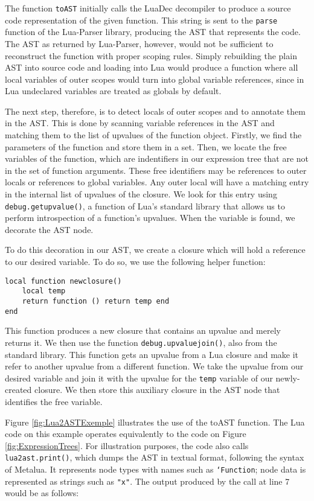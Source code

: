 \documentclass[english]{llncs}
\begin{document}
The function \texttt{toAST} initially calls the LuaDec decompiler to produce a source code representation of the given function.
This string is sent to the \texttt{parse} function of the Lua-Parser library, producing the AST that represents the code.
The AST as returned by Lua-Parser, however, would not be sufficient to reconstruct the function with proper scoping rules.
Simply rebuilding the plain AST into source code and loading into Lua would produce a function where all local variables
of outer scopes would turn into global variable references, since in Lua undeclared variables are treated as globals
by default.

The next step, therefore, is to detect locals of outer scopes and to annotate them in the AST. 
This is done by scanning variable references in the AST and matching them to the list of upvalues
of the function object.
Firstly, we find the parameters of the function and store them in a set.
Then, we locate the free variables of the function, which are indentifiers in our expression tree that are not in the set of function arguments.
These free identifiers may be references to outer locals or references to global variables.
Any outer local will have a matching entry in the internal list of upvalues of the closure.
We look for this entry using \texttt{debug.getupvalue()}, a function of Lua's standard library
that allows us to perform introspection of a function's upvalues.
When the variable is found, we decorate the AST node.

To do this decoration in our AST, we create a closure which will hold a reference
to our desired variable.
To do so, we use the following helper function:

\begin{verbatim}
local function newclosure()
    local temp
    return function () return temp end
end
\end{verbatim}

This function produces a new closure that contains an upvalue and merely returns it.
We then use the function \texttt{debug.upvaluejoin()}, also from the standard library.
This function gets an upvalue from a Lua closure and make it refer to another upvalue
from a different function. 
We take the upvalue from our desired variable and join it with the upvalue for the \texttt{temp} variable of our newly-created closure.
We then store this auxiliary closure in the AST node that identifies the free variable.

Figure \ref{fig:Lua2ASTExemple} illustrates the use of the toAST function.
The Lua code on this example operates equivalently to the code on Figure \ref{fig:ExpressionTrees}.
For illustration purposes, the code also calls \texttt{lua2ast.print()}, which dumps the AST in textual format,
following the syntax of Metalua. It represents node types with names such as \texttt{`Function}; node data is represented as strings such as \texttt{"x"}.
The output produced by the call at line 7 would be as follows:
\end{document}
